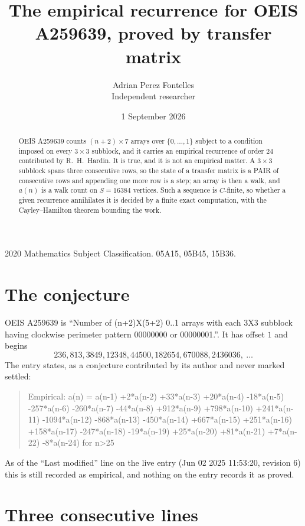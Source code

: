 \documentclass[11pt,a4paper]{article}
\title{The empirical recurrence for OEIS A259639, proved by transfer matrix}
\author{Adrian Perez Fontelles\\ \small Independent researcher}
\date{1 September 2026}
\theoremstyle{plain}
\theoremstyle{definition}
\begin{document}
\maketitle

\begin{abstract}
OEIS A259639 counts $(n+2)\times7$ arrays over $\{0,\dots,1\}$ subject to a condition imposed on
every $3\times3$ subblock, and it carries an empirical recurrence of order $24$
contributed by R.~H.~Hardin. It is true, and it is not an empirical matter. A $3\times3$
subblock spans three consecutive rows, so the state of a transfer matrix is a PAIR of
consecutive rows and appending one more row is a step; an array is then a walk, and
$a(n)$ is a walk count on $S=16384$ vertices. Such a sequence is $C$-finite, so whether a given
recurrence annihilates it is decided by a finite exact computation, with the Cayley--Hamilton
theorem bounding the work.
\end{abstract}

\noindent\small 2020 Mathematics Subject Classification. 05A15, 05B45, 15B36.\normalsize

\section{The conjecture}

OEIS A259639 is ``Number of (n+2)X(5+2) 0..1 arrays with each 3X3 subblock having clockwise perimeter pattern 00000000 or 00000001.''. It has offset $1$ and begins
\[
236, 813, 3849, 12348, 44500, 182654, 670088, 2436036,\ \dots
\]
The entry states, as a conjecture contributed by its author and never marked settled:
\begin{quote}
Empirical: a(n) = a(n-1) +2*a(n-2) +33*a(n-3) +20*a(n-4) -18*a(n-5) -257*a(n-6) -260*a(n-7) -44*a(n-8) +912*a(n-9) +798*a(n-10) +241*a(n-11) -1094*a(n-12) -868*a(n-13) -450*a(n-14) +667*a(n-15) +251*a(n-16) +158*a(n-17) -247*a(n-18) -19*a(n-19) +25*a(n-20) +81*a(n-21) +7*a(n-22) -8*a(n-24) for n>25
\end{quote}
As of the ``Last modified'' line on the live entry (Jun 02 2025 11:53:20, revision 6) this is still
recorded as empirical, and nothing on the entry records it as proved.

\section{Three consecutive lines}
\end{document}
